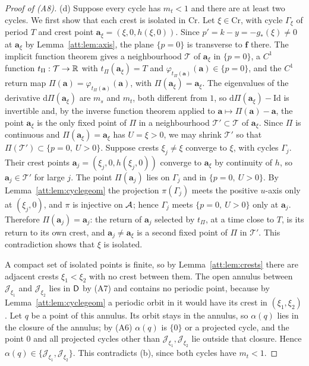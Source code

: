 \begin{proof}[Proof of (A8)]
(d) Suppose every cycle has $m_t<1$ and there are at least two cycles. We first show that each crest is isolated in $\mathrm{Cr}$. Let $\xi\in\mathrm{Cr}$, with cycle $\Gamma_\xi$ of period $T$ and crest point $\mathbf a_\xi=(\xi,0,h(\xi,0))$. Since $p'=k-y=-g_\ast(\xi)\ne0$ at $\mathbf a_\xi$ by Lemma~\ref{att:lem:axis}, the plane $\{p=0\}$ is transverse to $\mathbf f$ there. The implicit function theorem gives a neighbourhood $\mathcal T$ of $\mathbf a_\xi$ in $\{p=0\}$, a $C^1$ function $t_\Pi:\mathcal T\to\mathbb R$ with $t_\Pi(\mathbf a_\xi)=T$ and $\varphi_{t_\Pi(\mathbf a)}(\mathbf a)\in\{p=0\}$, and the $C^1$ return map $\Pi(\mathbf a)=\varphi_{t_\Pi(\mathbf a)}(\mathbf a)$, with $\Pi(\mathbf a_\xi)=\mathbf a_\xi$. The eigenvalues of the derivative $\mathrm d\Pi(\mathbf a_\xi)$ are $m_s$ and $m_t$, both different from $1$, so $\mathrm d\Pi(\mathbf a_\xi)-\mathrm{Id}$ is invertible and, by the inverse function theorem applied to $\mathbf a\mapsto\Pi(\mathbf a)-\mathbf a$, the point $\mathbf a_\xi$ is the only fixed point of $\Pi$ in a neighbourhood $\mathcal T'\subset\mathcal T$ of $\mathbf a_\xi$. Since $\Pi$ is continuous and $\Pi(\mathbf a_\xi)=\mathbf a_\xi$ has $U=\xi>0$, we may shrink $\mathcal T'$ so that $\Pi(\mathcal T')\subset\{p=0,\ U>0\}$. Suppose crests $\xi_j\ne\xi$ converge to $\xi$, with cycles $\Gamma_j$. Their crest points $\mathbf a_j=(\xi_j,0,h(\xi_j,0))$ converge to $\mathbf a_\xi$ by continuity of $h$, so $\mathbf a_j\in\mathcal T'$ for large $j$. The point $\Pi(\mathbf a_j)$ lies on $\Gamma_j$ and in $\{p=0,\ U>0\}$. By Lemma~\ref{att:lem:cyclegeom} the projection $\pi(\Gamma_j)$ meets the positive $u$-axis only at $(\xi_j,0)$, and $\pi$ is injective on $\mathcal A$; hence $\Gamma_j$ meets $\{p=0,\ U>0\}$ only at $\mathbf a_j$. Therefore $\Pi(\mathbf a_j)=\mathbf a_j$: the return of $\mathbf a_j$ selected by $t_\Pi$, at a time close to $T$, is its return to its own crest, and $\mathbf a_j\ne\mathbf a_\xi$ is a second fixed point of $\Pi$ in $\mathcal T'$. This contradiction shows that $\xi$ is isolated.

A compact set of isolated points is finite, so by Lemma~\ref{att:lem:crests} there are adjacent crests $\xi_1<\xi_2$ with no crest between them. The open annulus between $\mathcal J_{\xi_1}$ and $\mathcal J_{\xi_2}$ lies in $\mathsf D$ by (A7) and contains no periodic point, because by Lemma~\ref{att:lem:cyclegeom} a periodic orbit in it would have its crest in $(\xi_1,\xi_2)$. Let $q$ be a point of this annulus. Its orbit stays in the annulus, so $\alpha(q)$ lies in the closure of the annulus; by (A6) $\alpha(q)$ is $\{0\}$ or a projected cycle, and the point $0$ and all projected cycles other than $\mathcal J_{\xi_1},\mathcal J_{\xi_2}$ lie outside that closure. Hence $\alpha(q)\in\{\mathcal J_{\xi_1},\mathcal J_{\xi_2}\}$. This contradicts (b), since both cycles have $m_t<1$.


\end{proof}
